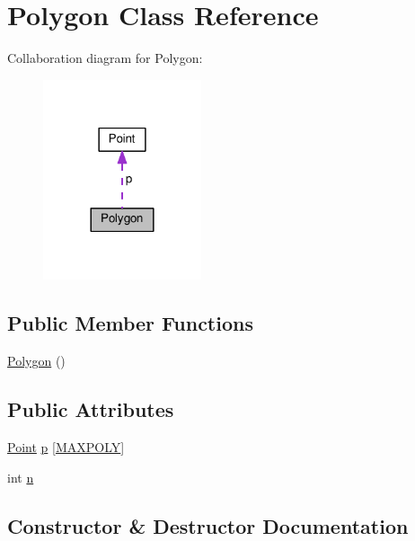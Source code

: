\hypertarget{classPolygon}{}\section{Polygon Class Reference}
\label{classPolygon}


Collaboration diagram for Polygon\+:
\nopagebreak
\begin{figure}[H]
\begin{center}
\leavevmode
\includegraphics[width=132pt]{classPolygon__coll__graph}
\end{center}
\end{figure}
\subsection*{Public Member Functions}
\begin{DoxyCompactItemize}
\item 
\hyperlink{classPolygon_ac183e712f8be1e13f1c9d5b4d4512ead}{Polygon} ()
\end{DoxyCompactItemize}
\subsection*{Public Attributes}
\begin{DoxyCompactItemize}
\item 
\hyperlink{classPoint}{Point} \hyperlink{classPolygon_ab9eed6eb2dc3e7e51e8b88e144bf68d0}{p} \mbox{[}\hyperlink{Slicker_8cpp_ae936b8f2104cec7519d956be29b10e2b}{M\+A\+X\+P\+O\+LY}\mbox{]}
\item 
int \hyperlink{classPolygon_a96568fe72cac8ee98d09cf62fd24a8ed}{n}
\end{DoxyCompactItemize}


\subsection{Constructor \& Destructor Documentation}
